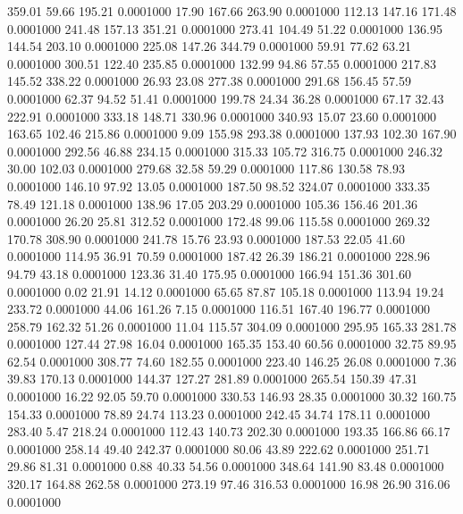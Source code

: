  359.01   59.66  195.21   0.0001000
  17.90  167.66  263.90   0.0001000
 112.13  147.16  171.48   0.0001000
 241.48  157.13  351.21   0.0001000
 273.41  104.49   51.22   0.0001000
 136.95  144.54  203.10   0.0001000
 225.08  147.26  344.79   0.0001000
  59.91   77.62   63.21   0.0001000
 300.51  122.40  235.85   0.0001000
 132.99   94.86   57.55   0.0001000
 217.83  145.52  338.22   0.0001000
  26.93   23.08  277.38   0.0001000
 291.68  156.45   57.59   0.0001000
  62.37   94.52   51.41   0.0001000
 199.78   24.34   36.28   0.0001000
  67.17   32.43  222.91   0.0001000
 333.18  148.71  330.96   0.0001000
 340.93   15.07   23.60   0.0001000
 163.65  102.46  215.86   0.0001000
   9.09  155.98  293.38   0.0001000
 137.93  102.30  167.90   0.0001000
 292.56   46.88  234.15   0.0001000
 315.33  105.72  316.75   0.0001000
 246.32   30.00  102.03   0.0001000
 279.68   32.58   59.29   0.0001000
 117.86  130.58   78.93   0.0001000
 146.10   97.92   13.05   0.0001000
 187.50   98.52  324.07   0.0001000
 333.35   78.49  121.18   0.0001000
 138.96   17.05  203.29   0.0001000
 105.36  156.46  201.36   0.0001000
  26.20   25.81  312.52   0.0001000
 172.48   99.06  115.58   0.0001000
 269.32  170.78  308.90   0.0001000
 241.78   15.76   23.93   0.0001000
 187.53   22.05   41.60   0.0001000
 114.95   36.91   70.59   0.0001000
 187.42   26.39  186.21   0.0001000
 228.96   94.79   43.18   0.0001000
 123.36   31.40  175.95   0.0001000
 166.94  151.36  301.60   0.0001000
   0.02   21.91   14.12   0.0001000
  65.65   87.87  105.18   0.0001000
 113.94   19.24  233.72   0.0001000
  44.06  161.26    7.15   0.0001000
 116.51  167.40  196.77   0.0001000
 258.79  162.32   51.26   0.0001000
  11.04  115.57  304.09   0.0001000
 295.95  165.33  281.78   0.0001000
 127.44   27.98   16.04   0.0001000
 165.35  153.40   60.56   0.0001000
  32.75   89.95   62.54   0.0001000
 308.77   74.60  182.55   0.0001000
 223.40  146.25   26.08   0.0001000
   7.36   39.83  170.13   0.0001000
 144.37  127.27  281.89   0.0001000
 265.54  150.39   47.31   0.0001000
  16.22   92.05   59.70   0.0001000
 330.53  146.93   28.35   0.0001000
  30.32  160.75  154.33   0.0001000
  78.89   24.74  113.23   0.0001000
 242.45   34.74  178.11   0.0001000
 283.40    5.47  218.24   0.0001000
 112.43  140.73  202.30   0.0001000
 193.35  166.86   66.17   0.0001000
 258.14   49.40  242.37   0.0001000
  80.06   43.89  222.62   0.0001000
 251.71   29.86   81.31   0.0001000
   0.88   40.33   54.56   0.0001000
 348.64  141.90   83.48   0.0001000
 320.17  164.88  262.58   0.0001000
 273.19   97.46  316.53   0.0001000
  16.98   26.90  316.06   0.0001000
